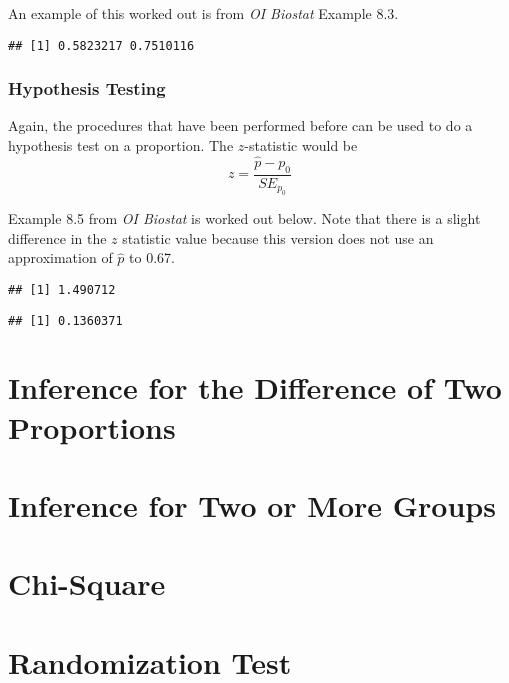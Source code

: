 An example of this worked out is from \textit{OI Biostat} Example 8.3.  
\begin{knitrout}
\color{fgcolor}\begin{kframe}
\begin{alltt}
 \hlkwb{=} \hlopt{*}\hlstd{(}\hlopt{-}\hlopt{/}
 \hlopt{-} \hlopt{*} \hlopt{+}  \hlopt{*}
\end{alltt}
\begin{verbatim}
## [1] 0.5823217 0.7510116
\end{verbatim}
\end{kframe}
\end{knitrout}

\subsubsection{Hypothesis Testing}
Again, the procedures that have been performed before can be used to do a hypothesis test on a proportion.  The $z$-statistic would be 
\[ z = \frac{\hat{p}-p_0}{SE_{p_0}}\]

Example 8.5 from \textit{OI Biostat} is worked out below.  Note that there is a slight difference in the $z$ statistic value because this version does not use an approximation of $\hat{p}$ to 0.67.  
\begin{knitrout}
\color{fgcolor}\begin{kframe}
\begin{alltt}
 \hlkwb{=} 
 \hlkwb{=} \hlopt{*}\hlstd{(}\hlopt{-}\hlopt{/}
 \hlkwb{=}  \hlopt{-} \hlopt{/}
\end{alltt}
\begin{verbatim}
## [1] 1.490712
\end{verbatim}
\begin{alltt}
\hlopt{*}  \hlstd{=} \hlstd{)}
\end{alltt}
\begin{verbatim}
## [1] 0.1360371
\end{verbatim}
\end{kframe}
\end{knitrout}

\section{Inference for the Difference of Two Proportions}


\section{Inference for Two or More Groups}


\section{Chi-Square} 


\section{Randomization Test}
